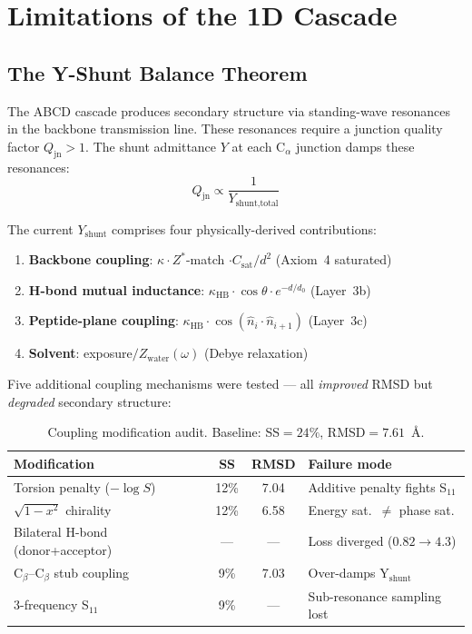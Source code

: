 \section{Limitations of the 1D Cascade}
\label{sec:1d_limitations}

\subsection{The Y-Shunt Balance Theorem}

The ABCD cascade produces secondary structure via standing-wave resonances in the backbone transmission line.  These resonances require a junction quality factor $Q_\text{jn} > 1$.  The shunt admittance $Y$ at each C$_\alpha$ junction damps these resonances:
\begin{equation}
    Q_\text{jn} \propto \frac{1}{Y_\text{shunt,total}}
\end{equation}

The current $Y_\text{shunt}$ comprises four physically-derived contributions:
\begin{enumerate}
    \item \textbf{Backbone coupling}: $\kappa \cdot Z^*$-match $\cdot C_\text{sat} / d^2$ (Axiom~4 saturated)
    \item \textbf{H-bond mutual inductance}: $\kappa_\text{HB} \cdot \cos\theta \cdot e^{-d/d_0}$ (Layer~3b)
    \item \textbf{Peptide-plane coupling}: $\kappa_\text{HB} \cdot \cos(\hat{n}_i \cdot \hat{n}_{i+1})$ (Layer~3c)
    \item \textbf{Solvent}: exposure$/Z_\text{water}(\omega)$ (Debye relaxation)
\end{enumerate}

\noindent Five additional coupling mechanisms were tested --- all \emph{improved} RMSD but \emph{degraded} secondary structure:

\begin{table}[H]
\centering
\caption{Coupling modification audit.  Baseline: SS$=24\%$, RMSD$=7.61$~\AA.}
\begin{tabular}{@{}l c c l@{}}
\toprule
Modification & SS & RMSD & Failure mode \\
\midrule
Torsion penalty ($-\log S$)        & 12\% & 7.04 & Additive penalty fights S$_{11}$ \\
$\sqrt{1-x^2}$ chirality           & 12\% & 6.58 & Energy sat.\ $\neq$ phase sat. \\
Bilateral H-bond (donor+acceptor)  & ---  & ---  & Loss diverged ($0.82 \to 4.3$) \\
C$_\beta$--C$_\beta$ stub coupling & 9\%  & 7.03 & Over-damps Y$_\text{shunt}$ \\
3-frequency S$_{11}$               & 9\%  & ---  & Sub-resonance sampling lost \\
\bottomrule
\end{tabular}
\end{table}

